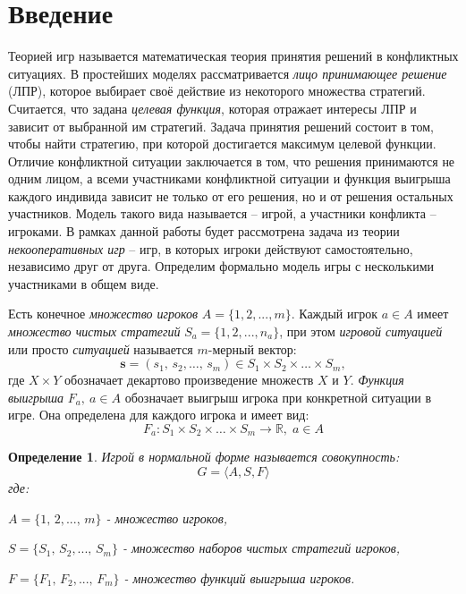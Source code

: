 \section{Введение}

\qquad Теорией игр называется математическая теория принятия решений
в конфликтных ситуациях. В простейших моделях рассматривается \textit{лицо
принимающее решение} (ЛПР), которое выбирает своё действие из некоторого
множества стратегий. Считается, что задана \textit{целевая функция},
которая отражает интересы ЛПР и зависит от выбранной им стратегий.
Задача принятия решений состоит в том, чтобы найти стратегию, 
при которой достигается максимум целевой функции. Отличие конфликтной ситуации
заключается в том, что решения принимаются не одним лицом, 
а всеми участниками конфликтной ситуации и функция выигрыша
каждого индивида зависит не только от его решения, но 
и от решения остальных участников.  Модель такого вида называется --
игрой, а участники конфликта -- игроками. В рамках данной работы
будет рассмотрена задача из теории \textit{некооперативных игр} -- 
игр, в которых игроки действуют самостоятельно, независимо друг 
от друга. Определим формально модель игры с несколькими участниками в общем виде.

Есть конечное \textit{множество игроков} $A = \{1, 2, ..., m \}$. 
Каждый игрок $a \in A$ имеет 
\textit{множество чистых стратегий} $S_a=\{1,2,...,n_a\}$, при этом 
\textit{игровой ситуацией} или просто \textit{ситуацией}
называется $m$-мерный вектор:
\begin{equation}
	\label{eq:game_situation}
	\textbf{s} = (s_1, \, s_2, \ldots , \, s_m) \in
	S_1 \times S_2 \times \ldots \times S_m,
\end{equation}
где $X \times Y$ обозначает декартово произведение множеств $X$ и $Y$.
\textit{Функция выигрыша} $F_a, \: a \in A$ обозначает выигрыш игрока при
конкретной ситуации в игре. Она определена для каждого игрока и имеет 
вид:
\begin{equation}
	\label{eq:single_dim_payoff_function}
	F_a: S_1 \times S_2 \times \ldots \times S_m \rightarrow 
	\mathbb R, \; a \in A
\end{equation}

\newtheorem{Defenition}{Определение}
\begin{Defenition}
	Игрой в нормальной форме называется совокупность:
	\begin{equation}
		G = \big \langle A, S, F \big \rangle
		\label{eq:normal_form_game}
	\end{equation}
	где: 
 
	$ A = \{1, \, 2, ..., \, m\}$ - множество игроков,

	$ S = \{S_1, \, S_2, ..., \, S_m\}$ - множество наборов чистых
	стратегий игроков,

	$ F = \{F_1, \, F_2, ..., \, F_m\}$ - множество функций выигрыша
	игроков. 
	\cite{vasin}
\end{Defenition}

